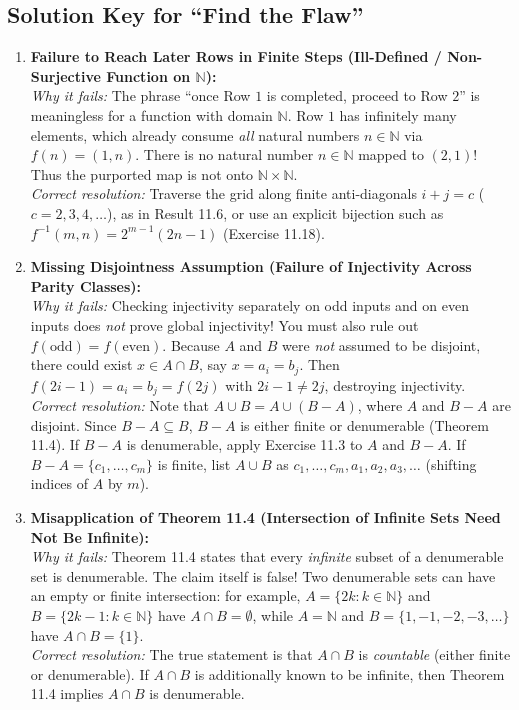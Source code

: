 \documentclass[11pt, letterpaper]{article}
\theoremstyle{definition}
\theoremstyle{remark}
\begin{document}
\subsection{Solution Key for ``Find the Flaw''}

\begin{enumerate}[label=\textbf{Flaw \arabic*:}]
    \item \textbf{Failure to Reach Later Rows in Finite Steps (Ill-Defined / Non-Surjective Function on $\mathbb{N}$):} \\
    \emph{Why it fails:} The phrase ``once Row $1$ is completed, proceed to Row $2$'' is meaningless for a function with domain $\mathbb{N}$. Row $1$ has infinitely many elements, which already consume \emph{all} natural numbers $n \in \mathbb{N}$ via $f(n) = (1, n)$. There is no natural number $n \in \mathbb{N}$ mapped to $(2, 1)$! Thus the purported map is not onto $\mathbb{N} \times \mathbb{N}$. \\
    \emph{Correct resolution:} Traverse the grid along finite anti-diagonals $i + j = c$ ($c = 2, 3, 4, \dots$), as in Result 11.6, or use an explicit bijection such as $f^{-1}(m, n) = 2^{m-1}(2n - 1)$ (Exercise 11.18).

    \item \textbf{Missing Disjointness Assumption (Failure of Injectivity Across Parity Classes):} \\
    \emph{Why it fails:} Checking injectivity separately on odd inputs and on even inputs does \emph{not} prove global injectivity! You must also rule out $f(\text{odd}) = f(\text{even})$. Because $A$ and $B$ were \emph{not} assumed to be disjoint, there could exist $x \in A \cap B$, say $x = a_i = b_j$. Then $f(2i - 1) = a_i = b_j = f(2j)$ with $2i - 1 \neq 2j$, destroying injectivity. \\
    \emph{Correct resolution:} Note that $A \cup B = A \cup (B - A)$, where $A$ and $B - A$ are disjoint. Since $B - A \subseteq B$, $B - A$ is either finite or denumerable (Theorem 11.4). If $B - A$ is denumerable, apply Exercise 11.3 to $A$ and $B - A$. If $B - A = \{c_1, \dots, c_m\}$ is finite, list $A \cup B$ as $c_1, \dots, c_m, a_1, a_2, a_3, \dots$ (shifting indices of $A$ by $m$).

    \item \textbf{Misapplication of Theorem 11.4 (Intersection of Infinite Sets Need Not Be Infinite):} \\
    \emph{Why it fails:} Theorem 11.4 states that every \emph{infinite} subset of a denumerable set is denumerable. The claim itself is false! Two denumerable sets can have an empty or finite intersection: for example, $A = \{2k : k \in \mathbb{N}\}$ and $B = \{2k - 1 : k \in \mathbb{N}\}$ have $A \cap B = \emptyset$, while $A = \mathbb{N}$ and $B = \{1, -1, -2, -3, \dots\}$ have $A \cap B = \{1\}$. \\
    \emph{Correct resolution:} The true statement is that $A \cap B$ is \emph{countable} (either finite or denumerable). If $A \cap B$ is additionally known to be infinite, then Theorem 11.4 implies $A \cap B$ is denumerable.


\end{enumerate}
\end{document}
